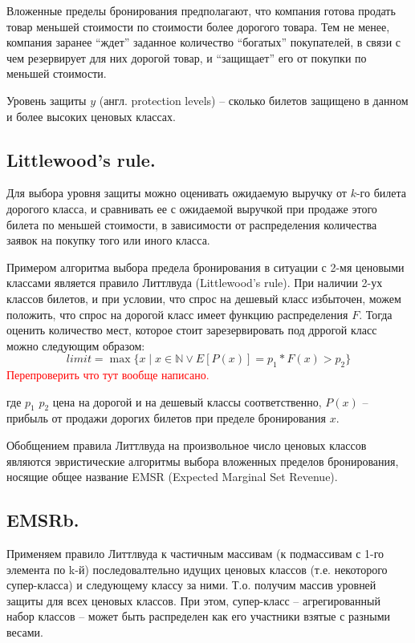 \documentclass[reqno]{article}
\theoremstyle{definition}
\theoremstyle{definition}
\theoremstyle{definition}
\theoremstyle{definition}
\theoremstyle{definition}
\theoremstyle{definition}
\theoremstyle{definition}
\theoremstyle{definition}
\theoremstyle{definition}
\begin{document}
		Вложенные пределы бронирования предполагают, что компания готова продать товар меньшей стоимости по стоимости более дорогого товара. Тем не менее, компания заранее ``ждет'' заданное количество ``богатых'' покупателей, в связи с чем резервирует для них дорогой товар, и ``защищает'' его от покупки по меньшей стоимости.
		
		Уровень защиты $y$ (англ. protection levels) -- сколько билетов защищено в данном и более высоких ценовых классах.
		
		\subsection{Littlewood's rule.}
		
		Для выбора уровня защиты можно оценивать ожидаемую выручку от $k$-го билета дорогого класса, и сравнивать ее с ожидаемой выручкой при продаже этого билета по меньшей стоимости, в зависимости от распределения количества заявок на покупку того или иного класса.
		
		Примером алгоритма выбора предела бронирования в ситуации с 2-мя ценовыми классами является правило Литтлвуда (Littlewood's rule). При наличии 2-ух классов билетов, и при условии, что спрос на дешевый класс избыточен, можем положить, что спрос на дорогой класс имеет функцию распределения ${F}$. Тогда оценить количество мест, которое стоит зарезервировать под дррогой класс можно следующим образом:
		$$limit = \max \{x \mid x \in \mathds{N} \vee E[P(x)] = p_1 * F(x) > p_2\}$$
		\textcolor{red}{Перепроверить что тут вообще написано.}
		
		где $p_1$ $p_2$ цена на дорогой и на дешевый классы соответственно, $P(x)$ -- прибыль от продажи дорогих билетов при пределе бронирования $x$.
		
		Обобщением правила Литтлвуда на произвольное число ценовых классов являются эвристические алгоритмы выбора вложенных пределов бронирования, носящие общее название EMSR (Expected Marginal Set Revenue).
		
		
		\subsection{EMSRb.}		
		Применяем правило Литтлвуда к частичным массивам (к подмассивам с 1-го элемента по k-й) последовалтельно идущих ценовых классов (т.е. некоторого супер-класса) и следующему классу за ними. Т.о. получим массив уровней защиты для всех ценовых классов. При этом, супер-класс -- агрегированный набор классов -- может быть распределен как его участники взятые с разными весами.	
		
\end{document}
